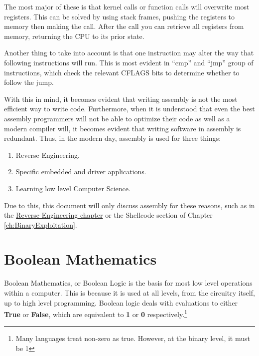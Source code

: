 			The most major of these is that kernel calls or function calls will overwrite most registers.
			This can be solved by using stack frames, pushing the registers to memory then making the call.
			After the call you can retrieve all registers from memory, returning the CPU to its prior state.

			Another thing to take into account is that one instruction may alter the way that following instructions will run.
			This is most evident in ``cmp'' and ``jmp'' group of instructions, which check the relevant CFLAGS bits to determine whether to follow the jump.

			With this in mind, it becomes evident that writing assembly is not the most efficient way to write code.
			Furthermore, when it is understood that even the best assembly programmers will not be able to optimize their code as well as a modern compiler will, it becomes evident that writing software in assembly is redundant.
			Thus, in the modern day, assembly is used for three things:
			\begin{enumerate}
				\item Reverse Engineering.
				\item Specific embedded and driver applications.
				\item Learning low level Computer Science.
			\end{enumerate}

			Due to this, this document will only discuss assembly for these reasons, such as in the \hyperref[ch:ReverseEngineering]{Reverse Engineering chapter} or the Shellcode section of Chapter \ref{ch:BinaryExploitation}.

	\section{Boolean Mathematics}
		Boolean Mathematics, or Boolean Logic is the basis for most low level operations within a computer.
		This is because it is used at all levels, from the circuitry itself, up to high level programming.
		Boolean logic deals with evaluations to either \textbf{True} or \textbf{False},
		which are equivalent to \textbf{1} or \textbf{0} respectively.\footnote{Many languages treat non-zero as true. However, at the binary level, it must be 1}

